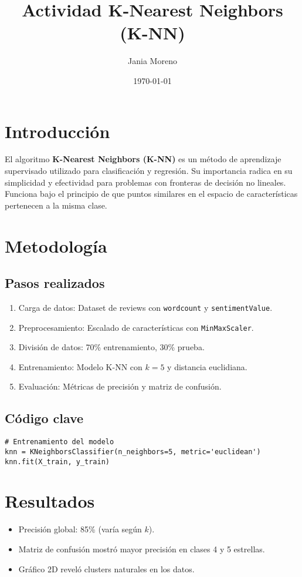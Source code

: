 \documentclass{article}
\title{Actividad K-Nearest Neighbors (K-NN)}
\author{Jania Moreno}
\date{\today}
\begin{document}
\maketitle

\section{Introducción}
El algoritmo \textbf{K-Nearest Neighbors (K-NN)} es un método de aprendizaje supervisado utilizado para clasificación y regresión. Su importancia radica en su simplicidad y efectividad para problemas con fronteras de decisión no lineales. Funciona bajo el principio de que puntos similares en el espacio de características pertenecen a la misma clase.

\section{Metodología}
\subsection{Pasos realizados}
\begin{enumerate}
    \item Carga de datos: Dataset de reviews con \texttt{wordcount} y \texttt{sentimentValue}.
    \item Preprocesamiento: Escalado de características con \texttt{MinMaxScaler}.
    \item División de datos: 70\% entrenamiento, 30\% prueba.
    \item Entrenamiento: Modelo K-NN con $k=5$ y distancia euclidiana.
    \item Evaluación: Métricas de precisión y matriz de confusión.
\end{enumerate}

\subsection{Código clave}
\begin{lstlisting}
# Entrenamiento del modelo
knn = KNeighborsClassifier(n_neighbors=5, metric='euclidean')
knn.fit(X_train, y_train)
\end{lstlisting}

\section{Resultados}
\begin{itemize}
    \item Precisión global: 85\% (varía según $k$).
    \item Matriz de confusión mostró mayor precisión en clases 4 y 5 estrellas.
    \item Gráfico 2D reveló clusters naturales en los datos.
\end{itemize}
\end{document}
